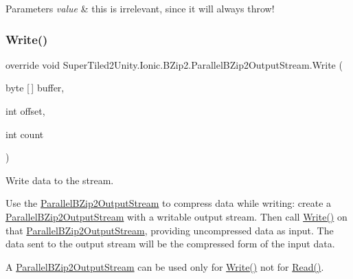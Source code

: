 \begin{DoxyParams}{Parameters}
{\em value} & this is irrelevant, since it will always throw!\\
\hline
\end{DoxyParams}
\mbox{\label{class_super_tiled2_unity_1_1_ionic_1_1_b_zip2_1_1_parallel_b_zip2_output_stream_a35ba7da75cc82ea269449f9497e3e148}} 
\subsubsection{\texorpdfstring{Write()}{Write()}}
{\footnotesize\ttfamily override void Super\+Tiled2\+Unity.\+Ionic.\+B\+Zip2.\+Parallel\+B\+Zip2\+Output\+Stream.\+Write (\begin{DoxyParamCaption}\item[{byte \mbox{[}$\,$\mbox{]}}]{buffer,  }\item[{int}]{offset,  }\item[{int}]{count }\end{DoxyParamCaption})}



Write data to the stream. 

Use the {\ttfamily \mbox{\hyperlink{class_super_tiled2_unity_1_1_ionic_1_1_b_zip2_1_1_parallel_b_zip2_output_stream}{Parallel\+B\+Zip2\+Output\+Stream}}} to compress data while writing\+: create a {\ttfamily \mbox{\hyperlink{class_super_tiled2_unity_1_1_ionic_1_1_b_zip2_1_1_parallel_b_zip2_output_stream}{Parallel\+B\+Zip2\+Output\+Stream}}} with a writable output stream. Then call {\ttfamily \mbox{\hyperlink{class_super_tiled2_unity_1_1_ionic_1_1_b_zip2_1_1_parallel_b_zip2_output_stream_a35ba7da75cc82ea269449f9497e3e148}{Write()}}} on that {\ttfamily \mbox{\hyperlink{class_super_tiled2_unity_1_1_ionic_1_1_b_zip2_1_1_parallel_b_zip2_output_stream}{Parallel\+B\+Zip2\+Output\+Stream}}}, providing uncompressed data as input. The data sent to the output stream will be the compressed form of the input data. 

A {\ttfamily \mbox{\hyperlink{class_super_tiled2_unity_1_1_ionic_1_1_b_zip2_1_1_parallel_b_zip2_output_stream}{Parallel\+B\+Zip2\+Output\+Stream}}} can be used only for {\ttfamily \mbox{\hyperlink{class_super_tiled2_unity_1_1_ionic_1_1_b_zip2_1_1_parallel_b_zip2_output_stream_a35ba7da75cc82ea269449f9497e3e148}{Write()}}} not for {\ttfamily \mbox{\hyperlink{class_super_tiled2_unity_1_1_ionic_1_1_b_zip2_1_1_parallel_b_zip2_output_stream_a40117f23d13b05b6624de03ef4a2fc0c}{Read()}}}. 


